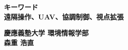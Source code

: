 
\begin{flushleft}
\textbf{キーワード}\\
\textbf{遠隔操作、UAV、協調制御、視点拡張}

\end{flushleft}

\begin{flushright}
\textbf{慶應義塾大学 環境情報学部}\\
\textbf{森重 浩直}
\end{flushright}
\newpage

